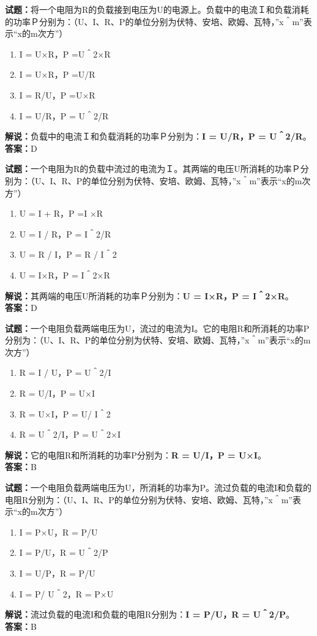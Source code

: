 \documentclass{ctexbook}
\begin{document}
\bigskip


\noindent\textbf{试题：}将一个电阻为R的负载接到电压为U的电源上。负载中的电流Ｉ和负载消耗的功率Ｐ分别为：（U、I、R、P的单位分别为伏特、安培、欧姆、瓦特，”x＾m”表示“x的m次方”）
\begin{enumerate}[leftmargin=3em]
\item I = U×R，P =U＾2×R
\item I = U×R，P =U/R
\item I = R/U，P =U×R
\item I = U/R，P = U＾2/R
\end{enumerate}
\noindent\textbf{解说：}负载中的电流Ｉ和负载消耗的功率Ｐ分别为：\textbf{I = U/R，P = U＾2/R}。\\\noindent\textbf{答案：}D




\bigskip


\noindent\textbf{试题：}一个电阻为R的负载中流过的电流为Ｉ。其两端的电压U所消耗的功率Ｐ分别为：（U、I、R、P的单位分别为伏特、安培、欧姆、瓦特，”x＾m”表示“x的m次方”）
\begin{enumerate}[leftmargin=3em]
\item U = I + R，P =I ×R
\item U = I / R，P = I＾2/R
\item U = R / I，P = R / I＾2
\item U = I×R，P = I＾2×R
\end{enumerate}
\noindent\textbf{解说：}其两端的电压U所消耗的功率Ｐ分别为：\textbf{U = I×R，P = I＾2×R}。\\\noindent\textbf{答案：}D


\bigskip


\noindent\textbf{试题：}一个电阻负载两端电压为U，流过的电流为I。它的电阻R和所消耗的功率P分别为：（U、I、R、P的单位分别为伏特、安培、欧姆、瓦特，”x＾m”表示“x的m次方”）
\begin{enumerate}[leftmargin=3em]
\item R = I / U，P = U＾2/I
\item R = U/I，P = U×I
\item R = U×I，P = U/ I＾2
\item R = U＾2/I，P = U＾2×I
\end{enumerate}
\noindent\textbf{解说：}它的电阻R和所消耗的功率P分别为：\textbf{R = U/I，P = U×I}。\\\noindent\textbf{答案：}B




\bigskip


\noindent\textbf{试题：}一个电阻负载两端电压为U，所消耗的功率为P。流过负载的电流I和负载的电阻R分别为：（U、I、R、P的单位分别为伏特、安培、欧姆、瓦特，”x＾m”表示“x的m次方”）
\begin{enumerate}[leftmargin=3em]
\item I = P×U，R = P/U
\item I = P/U，R = U＾2/P
\item I = U/P，R = P/U
\item I = P/ U＾2，R = P×U
\end{enumerate}
\noindent\textbf{解说：}流过负载的电流I和负载的电阻R分别为：\textbf{I = P/U，R = U＾2/P}。\\\noindent\textbf{答案：}B
\end{document}

